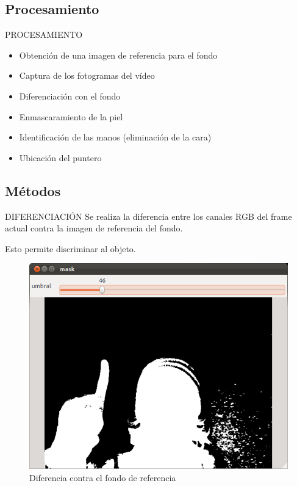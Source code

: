 \documentclass{beamer}
\begin{document}
\subsection[Procesamiento]{Procesamiento}
\begin{frame}{PROCESAMIENTO}
   	 \begin{itemize}
   		 \item Obtención de una imagen de referencia para el fondo
   		 \item Captura de los fotogramas del vídeo
   		 \item Diferenciación con el fondo
   		 \item Enmascaramiento de la piel
   		 \item Identificación de las manos (eliminación de la cara)
   		 \item Ubicación del puntero
   	 \end{itemize}


\end{frame}


\subsection[Métodos]{Métodos}
\begin{frame}{DIFERENCIACIÓN}
		Se realiza la diferencia entre los canales RGB del frame actual contra
		la imagen de referencia del fondo.
		
		Esto permite discriminar al objeto.

	\begin{figure}[tbhp]
	\centerline{\includegraphics[scale=0.2]{3_mask}}
	\caption{Diferencia contra el fondo de referencia}
	\label{fig:diferenciacion}
	\end{figure}
\end{frame}
\end{document}
